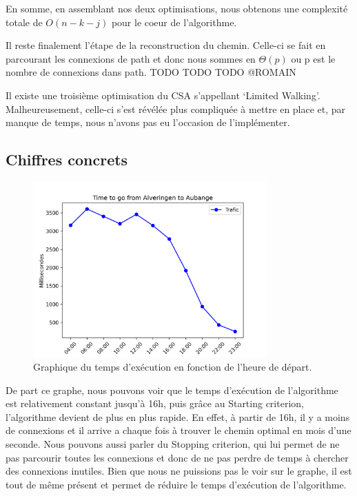\documentclass[12pt]{article}
\begin{document}
En somme, en assemblant nos deux optimisations, nous obtenons une complexité totale de $O(n - k - j)$ pour le coeur de l'algorithme.

Il reste finalement l'étape de la reconstruction du chemin. Celle-ci se fait en parcourant les connexions de path et donc nous sommes en $\Theta(p)$ ou p est le nombre de connexions dans path.
TODO TODO TODO @ROMAIN

Il existe une troisième optimisation du CSA s'appellant `Limited Walking'. Malheureusement, celle-ci s'est révélée plus compliquée à mettre en place et, par manque de temps, 
nous n'avons pas eu l'occasion de l'implémenter. %

\subsection{Chiffres concrets}
\begin{figure}[H]
  \centering
  \includegraphics[width=0.8\textwidth]{graphique_traffique}
  \caption{Graphique du temps d'exécution en fonction de l'heure de départ.}
  \label{fig:graphique_traffique}
\end{figure}
De part ce graphe, nous pouvons voir que le temps d'exécution de l'algorithme est relativement constant jusqu'à 16h, puis grâce au Starting criterion,
l'algorithme devient de plus en plus rapide. En effet, à partir de 16h, il y a moins de connexions et il arrive a chaque fois à trouver le chemin optimal en mois d'une seconde.
Nous pouvons aussi parler du Stopping criterion, qui lui permet de ne pas parcourir toutes les connexions et donc de ne pas perdre de temps à chercher des connexions inutiles.
Bien que nous ne puissions pas le voir sur le graphe, il est tout de même présent et permet de réduire le temps d'exécution de l'algorithme.
\end{document}
